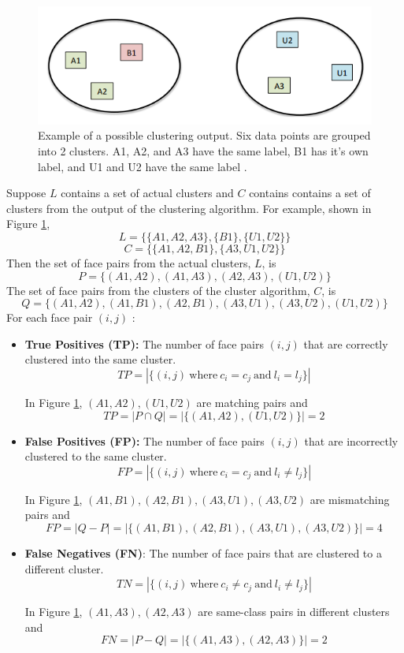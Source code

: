 \documentclass[12pt,english]{article}
\begin{document}
\begin{figure}[!tbp]
 \centering
    \includegraphics[width=\columnwidth]{figures/fmeasure.png}
    \caption{Example of a possible clustering output. Six data points are grouped into 2 clusters. A1, A2, and A3 have the same label, B1 has it's own label, and U1 and U2 have the same label \cite{otto}.}
    \label{fig:fmeasure}
\end{figure}
\quad
Suppose $L$ contains a set of actual clusters and $C$ contains contains a set of clusters from the output of the clustering algorithm. For example, shown in Figure \ref{fig:fmeasure}, $$L = \{\{A1, A2, A3\}, \{B1\}, \{U1, U2\}\}$$ $$C = \{\{A1, A2, B1\}, \{A3, U1, U2 \}\}$$
Then the set of face pairs from the actual clusters, $L$, is $$P = \{(A1, A2), (A1, A3), (A2, A3), (U1, U2)\}$$ 
The set of face pairs from the clusters of the cluster algorithm, $C$, is $$Q = \{(A1, A2), (A1, B1), (A2, B1), (A3, U1), (A3, U2), (U1, U2)\}$$
For each face pair $(i, j)$ \cite{thesis}: \\
\begin{itemize}
\item \textbf{True Positives (TP):} The number of face pairs $(i, j)$ that are correctly clustered into the same cluster.
$$TP = | \{(i, j) \ \textrm{where} \ c_{i} = c_{j} \ \textrm{and} \ l_{i} = l_{j}\}|$$

In Figure \ref{fig:fmeasure}, $(A1, A2), (U1, U2)$ are matching pairs and
$$TP = | P \cap Q | = |\{(A1, A2), (U1, U2)\}| = 2$$

\item \textbf{False Positives (FP):} The number of face pairs $(i, j)$ that are incorrectly clustered to the same cluster. $$FP = | \{(i, j) \ \textrm{where} \ c_{i} = c_{j} \ \textrm{and} \ l_{i} \neq l_{j}\}|$$

In Figure \ref{fig:fmeasure}, $(A1, B1), (A2, B1), (A3, U1), (A3, U2)$ are mismatching pairs and $$FP = |Q - P| = |\{(A1, B1), (A2, B1), (A3, U1), (A3, U2)\}| = 4$$ 

\item \textbf{False Negatives (FN)}: The number of face pairs that are clustered to a different cluster. $$TN = | \{(i, j) \ \textrm{where} \ c_{i} \neq c_{j} \ \textrm{and} \ l_{i} \neq l_{j}\}|$$

In Figure \ref{fig:fmeasure}, $(A1, A3), (A2, A3)$ are same-class pairs in different clusters and $$FN = |P - Q| = |\{(A1, A3), (A2, A3)\}| = 2$$
\end{itemize}
\end{document}
